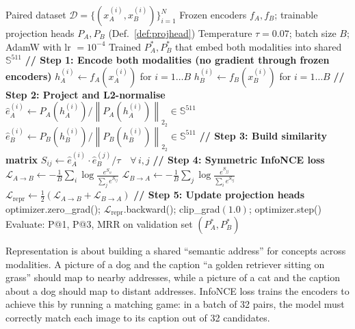 \documentclass[12pt,a4paper]{article}
\theoremstyle{definition}
\theoremstyle{plain}
\theoremstyle{remark}
\newcommand{\Sph}{\mathbb{S}}
\newcommand{\Norm}[1]{\left\|#1\right\|_2}
\begin{document}
\begin{algorithm}[H]
\caption{Challenge 1: Multimodal Representation Learning (Coordinated Embedding)}
\label{alg:repr}
\begin{algorithmic}[1]
\Require Paired dataset $\mathcal{D} = \{(x_A^{(i)}, x_B^{(i)})\}_{i=1}^N$
\Require Frozen encoders $f_A, f_B$; trainable projection heads $P_A, P_B$ (Def.~\ref{def:projhead})
\Require Temperature $\tau = 0.07$; batch size $B$; AdamW with lr $= 10^{-4}$
\Ensure Trained $P_A^*, P_B^*$ that embed both modalities into shared $\Sph^{511}$
    \State \textbf{// Step 1: Encode both modalities (no gradient through frozen encoders)}
    \State $h_A^{(i)} \gets f_A(x_A^{(i)})$ for $i=1\ldots B$ 
    \State $h_B^{(i)} \gets f_B(x_B^{(i)})$ for $i=1\ldots B$ 
    \State \textbf{// Step 2: Project and L2-normalise}
    \State $\hat{e}_A^{(i)} \gets P_A(h_A^{(i)}) / \Norm{P_A(h_A^{(i)})}_2 \in \Sph^{511}$
    \State $\hat{e}_B^{(i)} \gets P_B(h_B^{(i)}) / \Norm{P_B(h_B^{(i)})}_2 \in \Sph^{511}$
    \State \textbf{// Step 3: Build similarity matrix}
    \State $S_{ij} \gets \hat{e}_A^{(i)} \cdot \hat{e}_B^{(j)} / \tau \quad \forall\, i,j$ 
    \State \textbf{// Step 4: Symmetric InfoNCE loss}
    \State $\mathcal{L}_{A \to B} \gets -\frac{1}{B}\sum_i \log\frac{e^{S_{ii}}}{\sum_j e^{S_{ij}}}$
    \State $\mathcal{L}_{B \to A} \gets -\frac{1}{B}\sum_j \log\frac{e^{S_{jj}}}{\sum_i e^{S_{ij}}}$
    \State $\mathcal{L}_{\text{repr}} \gets \frac{1}{2}(\mathcal{L}_{A \to B} + \mathcal{L}_{B \to A})$
    \State \textbf{// Step 5: Update projection heads}
    \State optimizer.zero\_grad(); $\mathcal{L}_{\text{repr}}$.backward(); clip\_grad$(1.0)$; optimizer.step()
  \EndFor
  \State Evaluate: P@1, P@3, MRR on validation set
\EndFor
\State \Return $(P_A^*, P_B^*)$
\end{algorithmic}
\end{algorithm}

\begin{tcolorbox}[laymanbox]
Representation is about building a shared ``semantic address'' for concepts across modalities. A picture of a dog and the caption ``a golden retriever sitting on grass'' should map to nearby addresses, while a picture of a cat and the caption about a dog should map to distant addresses. InfoNCE loss trains the encoders to achieve this by running a matching game: in a batch of 32 pairs, the model must correctly match each image to its caption out of 32 candidates.
\end{tcolorbox}
\end{document}
